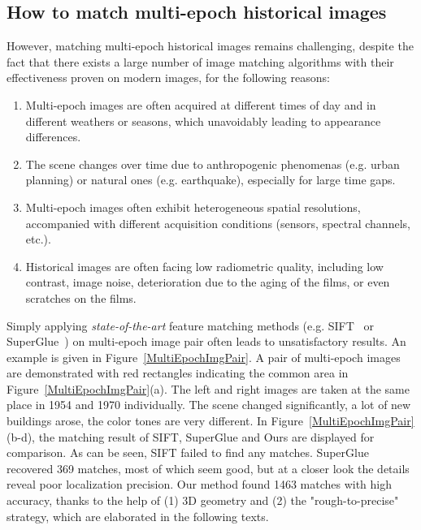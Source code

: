\subsection{How to match multi-epoch historical images}
However, matching multi-epoch historical images remains challenging, despite the fact that there exists a large number of image matching algorithms with their effectiveness proven on modern images, for the following reasons:
\begin{enumerate}
	\item Multi-epoch images are often acquired at different times of day and in different weathers or seasons, which unavoidably leading to appearance differences.
	\item The scene changes over time due to anthropogenic phenomenas (e.g. urban planning) or natural ones (e.g. earthquake), especially for large time gaps.
	\item Multi-epoch images often exhibit heterogeneous spatial resolutions, accompanied with different acquisition conditions (sensors, spectral channels, etc.).
	\item Historical images are often facing low radiometric quality, including low contrast, image noise, deterioration due to the aging of the films, or even scratches on the films.
\end{enumerate}
Simply applying \textit{state-of-the-art} feature matching methods (e.g. SIFT~\cite{lowe2004distinctive} or SuperGlue~\cite{sarlin2020superglue}) on multi-epoch image pair often leads to unsatisfactory results. An example is given in Figure~\ref{MultiEpochImgPair}. A pair of multi-epoch images are demonstrated with red rectangles indicating the common area in Figure~\ref{MultiEpochImgPair}(a). The left and right images are taken at the same place in 1954 and 1970 individually. The scene changed significantly, a lot of new buildings arose, the color tones are very different. In Figure~\ref{MultiEpochImgPair}(b-d), the matching result of SIFT, SuperGlue and Ours are displayed for comparison. As can be seen, SIFT failed to find any matches. SuperGlue recovered 369 matches, most of which seem good, but at a closer look the details reveal poor localization precision. Our method found 1463 matches with high accuracy, thanks to the help of (1) 3D geometry and (2) the "rough-to-precise" strategy, which are elaborated in the following texts.
